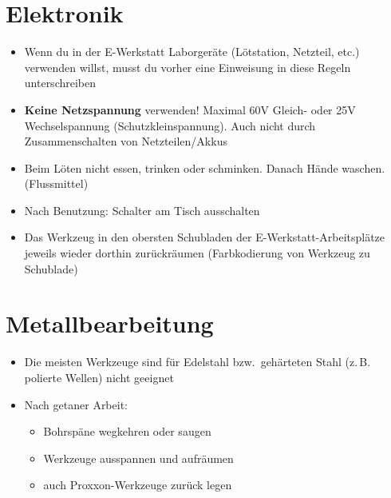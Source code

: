 \documentclass[13pt]{\basedir/fablab-document}
\begin{document}
\vbox{\vspace{0,5cm}}

\section{Elektronik}
\begin{itemize}
  \item Wenn du in der E-Werkstatt Laborgeräte (Lötstation, Netzteil, etc.) verwenden willst, musst du vorher eine Einweisung in diese Regeln unterschreiben
  \item \textbf{Keine Netzspannung} verwenden! Maximal 60V Gleich- oder 25V Wechselspannung (Schutzkleinspannung). Auch nicht durch Zusammenschalten von Netzteilen/Akkus

 \item Beim Löten nicht essen, trinken oder schminken. Danach Hände waschen. (Flussmittel)
 \item Nach Benutzung: Schalter am Tisch ausschalten
 \item Das Werkzeug in den obersten Schubladen der E-Werkstatt-Arbeitsplätze jeweils wieder dorthin zurückräumen (Farbkodierung von Werkzeug zu Schublade)
\end{itemize}


\section{Metallbearbeitung}
\begin{itemize}
	\item Die meisten Werkzeuge sind für Edelstahl bzw.\  gehärteten Stahl (z.\,B. polierte Wellen) nicht geeignet
	\item Nach getaner Arbeit:
	\begin{itemize}
		\item Bohrspäne wegkehren oder saugen
		\item Werkzeuge ausspannen und aufräumen
		\item auch Proxxon-Werkzeuge zurück legen
	\end{itemize}
\end{itemize}
\end{document}
